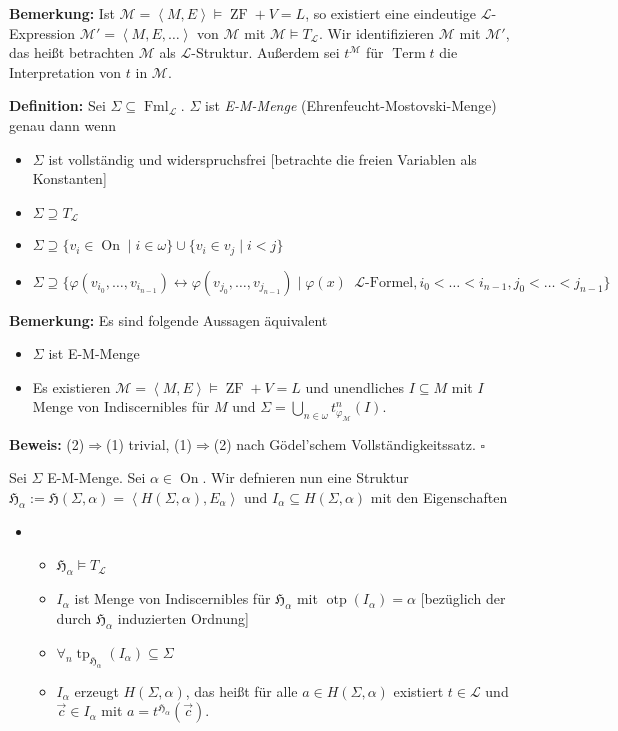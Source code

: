 \documentclass[a4paper,fontsize=11pt]{scrartcl}
\newcommand{\Term}{\operatorname{Term}}
\newcommand{\ZF}{\operatorname{ZF}}
\newcommand{\Fml}{\operatorname{Fml}}
\newcommand{\On}{\operatorname{On}}
\newcommand{\otp}{\operatorname{otp}}
\newcommand{\tp}{\operatorname{tp}}
\begin{document}
{\bf Bemerkung:} Ist $\mathcal{M}=\left<M,E\right>\models\ZF+V=L$, so
existiert eine eindeutige $\mathcal{L}$-Expression
$\mathcal{M}'=\left<M,E,\ldots\right>$ von $\mathcal{M}$ mit
$\mathcal{M}\models T_{\mathcal{L}}$. Wir identifizieren $\mathcal{M}$
mit $\mathcal{M}'$, das heißt betrachten $\mathcal{M}$ als
$\mathcal{L}$-Struktur. Außerdem sei $t^{\mathcal{M}}$ für $\Term t$
die Interpretation von $t$ in $\mathcal{M}$.

{\bf Definition:} Sei $\Sigma\subseteq\Fml_{\mathcal{L}}$. $\Sigma$
ist {\it E-M-Menge} (Ehrenfeucht-Mostovski-Menge) genau dann wenn
\begin{itemize}
  \item[(E1)] $\Sigma$ ist vollständig und widerspruchsfrei [betrachte
    die freien Variablen als Konstanten]
  \item[(E2)] $\Sigma\supseteq T_{\mathcal{L}}$
  \item[(E3)] $\Sigma\supseteq\{v_i\in\On\mid i\in\omega\}\cup\{v_i\in
    v_j\mid i<j\}$
  \item[(E4)] $\Sigma\supseteq\{\varphi(v_{i_0},\ldots,v_{i_{n-1}})
    \leftrightarrow
    \varphi(v_{j_0},\ldots,v_{j_{n-1}})\mid \varphi(x)\phantom{a}
    \mathcal{L}\mbox{-Formel},
    i_0<\ldots<i_{n-1},j_0<\ldots<j_{n-1}\}$
\end{itemize}

{\bf Bemerkung:} Es sind folgende Aussagen äquivalent
\begin{itemize}
  \item[(1)] $\Sigma$ ist E-M-Menge
  \item[(2)] Es existieren
    $\mathcal{M}=\left<M,E\right>\models\ZF+V=L$ und unendliches
    $I\subseteq M$ mit $I$ Menge von Indiscernibles für $M$ und
    $\Sigma=\bigcup\limits_{n\in\omega}t_{\varphi_{\mathcal{M}}}^n(I)$.
\end{itemize}

{\bf Beweis:} (2)$\Rightarrow$(1) trivial, (1)$\Rightarrow$(2) nach
Gödel'schem Vollständigkeitssatz.
\hfill $\square$

Sei $\Sigma$ E-M-Menge. Sei $\alpha\in\On$. Wir defnieren nun eine
Struktur
$\mathfrak{H}_\alpha:=\mathfrak{H}(\Sigma,\alpha)=\left<H(\Sigma,\alpha),E_\alpha\right>$
und $I_\alpha\subseteq H(\Sigma,\alpha)$ mit den Eigenschaften
\begin{itemize}
  \item[(E5)]
    \begin{itemize}
      \item[(a)] $\mathfrak{H}_\alpha\models T_{\mathcal{L}}$
      \item[(b)] $I_\alpha$ ist Menge von Indiscernibles für
        $\mathfrak{H}_\alpha$ mit $\otp(I_\alpha)=\alpha$ [bezüglich
        der durch $\mathfrak{H}_\alpha$ induzierten Ordnung]
      \item[(c)]
        $\forall_n\tp_{\mathfrak{H}_\alpha}(I_\alpha)\subseteq\Sigma$
      \item[(d)] $I_\alpha$ erzeugt $H(\Sigma,\alpha)$, das heißt für
        alle $a\in H(\Sigma,\alpha)$ existiert $t\in\mathcal{L}$ und
        $\vec{c}\in I_\alpha$ mit
        $a=t^{\mathfrak{H}_\alpha}(\vec{c})$.
    \end{itemize}
\end{itemize}
\end{document}
